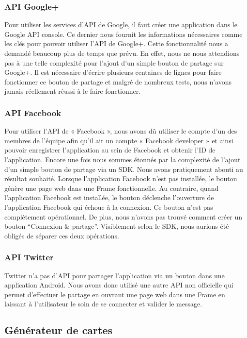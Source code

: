 \documentclass{report}
\begin{document}
\subsubsection{API Google+}

Pour utiliser les services d’API de Google, il faut créer une application dans le Google API console. Ce dernier nous fournit les informations nécessaires comme les clés pour pouvoir utiliser l’API de Google+. Cette fonctionnalité nous a demandé beaucoup plus de temps que prévu. En effet, nous ne nous attendions pas à une telle complexité pour l’ajout d’un simple bouton de partage sur Google+. Il est nécessaire d’écrire plusieurs centaines de lignes pour faire fonctionner ce bouton de partage et malgré de nombreux tests, nous n’avons jamais réellement réussi à le faire fonctionner.

\subsubsection{API Facebook}

Pour utiliser l’API de « Facebook », nous avons dû utiliser le compte d’un des membres de l’équipe afin qu’il ait un compte « Facebook developer » et ainsi pouvoir enregistrer l’application au sein de Facebook et obtenir l’ID de l’application. Encore une fois nous sommes étonnés par la complexité de l’ajout d’un simple bouton de partage via un SDK. Nous avons pratiquement abouti au résultat souhaité. Lorsque l’application Facebook n’est pas installée, le bouton génère une page web dans une Frame fonctionnelle. Au contraire, quand l’application Facebook est installée, le bouton déclenche l’ouverture de l’application Facebook qui échoue à la connexion. Ce bouton n’est pas complètement opérationnel. De plus, nous n’avons pas trouvé comment créer un bouton “Connexion \& partage”. Visiblement selon le SDK, nous aurions été obligés de séparer ces deux opérations.

\subsubsection{API Twitter}

Twitter n’a pas d’API pour partager l’application via un bouton dans une application Android. Nous avons donc utilisé une autre API non officielle qui permet d’effectuer le partage en ouvrant une page web dans une Frame en laissant à l’utilisateur le soin de se connecter et valider le message.

\subsection{Générateur de cartes}
\end{document}
